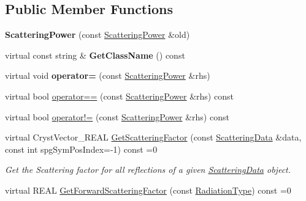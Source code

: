 \subsection*{Public Member Functions}
\begin{DoxyCompactItemize}
\item 
\mbox{\label{class_obj_cryst_1_1_scattering_power_a40d392b01f277a90affc2825ffa2e28d}} 
{\bfseries Scattering\+Power} (const \mbox{\hyperlink{class_obj_cryst_1_1_scattering_power}{Scattering\+Power}} \&old)
\item 
\mbox{\label{class_obj_cryst_1_1_scattering_power_a6e9d2a537aafdf4d7334ce85e31d3a92}} 
virtual const string \& {\bfseries Get\+Class\+Name} () const
\item 
\mbox{\label{class_obj_cryst_1_1_scattering_power_aa107d40627bd275f8f3841f77cd10179}} 
virtual void {\bfseries operator=} (const \mbox{\hyperlink{class_obj_cryst_1_1_scattering_power}{Scattering\+Power}} \&rhs)
\item 
virtual bool \mbox{\hyperlink{class_obj_cryst_1_1_scattering_power_a62eb0d6d4518cef7c28c377bd3ac9fe4}{operator==}} (const \mbox{\hyperlink{class_obj_cryst_1_1_scattering_power}{Scattering\+Power}} \&rhs) const
\item 
virtual bool \mbox{\hyperlink{class_obj_cryst_1_1_scattering_power_af898f48dfd85caf200be1e30263145cb}{operator!=}} (const \mbox{\hyperlink{class_obj_cryst_1_1_scattering_power}{Scattering\+Power}} \&rhs) const
\item 
virtual Cryst\+Vector\+\_\+\+R\+E\+AL \mbox{\hyperlink{class_obj_cryst_1_1_scattering_power_af18f3eaaf45af87bc3a2a0ff21bc34b6}{Get\+Scattering\+Factor}} (const \mbox{\hyperlink{class_obj_cryst_1_1_scattering_data}{Scattering\+Data}} \&data, const int spg\+Sym\+Pos\+Index=-\/1) const =0
\begin{DoxyCompactList}\small\item\em Get the Scattering factor for all reflections of a given \mbox{\hyperlink{class_obj_cryst_1_1_scattering_data}{Scattering\+Data}} object. \end{DoxyCompactList}\item 
virtual R\+E\+AL \mbox{\hyperlink{class_obj_cryst_1_1_scattering_power_a854b51b9b08e96af0fe7986fe372c50c}{Get\+Forward\+Scattering\+Factor}} (const \mbox{\hyperlink{namespace_obj_cryst_a48fe50a094c607f8897378934d3d73ef}{Radiation\+Type}}) const =0

\end{DoxyCompactItemize}
